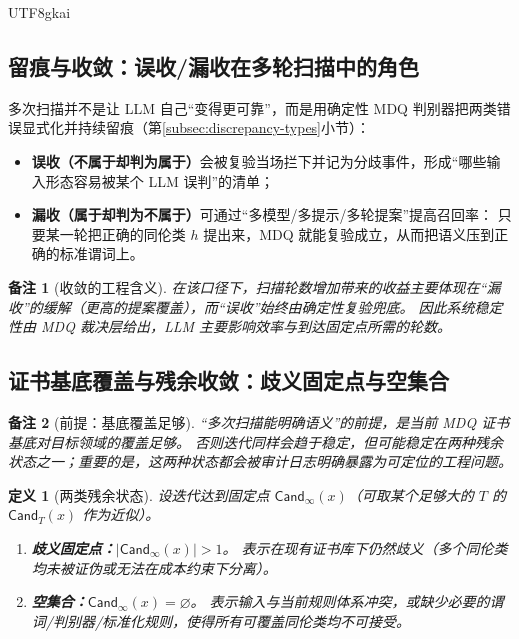 \documentclass[12pt]{article}
\newtheorem{definition}{定义}[section]
\newtheorem{remark}{备注}[section]
\begin{document}
\begin{CJK*}{UTF8}{gkai}
\subsection{留痕与收敛：误收/漏收在多轮扫描中的角色}
\label{subsec:discrepancy-and-convergence}

多次扫描并不是让 LLM 自己“变得更可靠”，而是用确定性 MDQ 判别器把两类错误显式化并持续留痕（第\ref{subsec:discrepancy-types}小节）：
\begin{itemize}
  \item \textbf{误收（不属于却判为属于）}会被复验当场拦下并记为分歧事件，形成“哪些输入形态容易被某个 LLM 误判”的清单；
  \item \textbf{漏收（属于却判为不属于）}可通过“多模型/多提示/多轮提案”提高召回率：
  只要某一轮把正确的同伦类 $h$ 提出来，MDQ 就能复验成立，从而把语义压到正确的标准谓词上。
\end{itemize}

\begin{remark}[收敛的工程含义]
在该口径下，扫描轮数增加带来的收益主要体现在“漏收”的缓解（更高的提案覆盖），而“误收”始终由确定性复验兜底。
因此系统稳定性由 MDQ 裁决层给出，LLM 主要影响效率与到达固定点所需的轮数。
\end{remark}

\subsection{证书基底覆盖与残余收敛：歧义固定点与空集合}
\label{subsec:basis-coverage-residual}

\begin{remark}[前提：基底覆盖足够]
“多次扫描能明确语义”的前提，是当前 MDQ 证书基底对目标领域的覆盖足够。
否则迭代同样会趋于稳定，但可能稳定在两种残余状态之一；重要的是，这两种状态都会被审计日志明确暴露为可定位的工程问题。
\end{remark}

\begin{definition}[两类残余状态]
设迭代达到固定点 $\mathsf{Cand}_\infty(x)$（可取某个足够大的 $T$ 的 $\mathsf{Cand}_T(x)$ 作为近似）。
\begin{enumerate}
  \item \textbf{歧义固定点：}$|\mathsf{Cand}_\infty(x)|>1$。
  表示在现有证书库下仍然歧义（多个同伦类均未被证伪或无法在成本约束下分离）。
  \item \textbf{空集合：}$\mathsf{Cand}_\infty(x)=\varnothing$。
  表示输入与当前规则体系冲突，或缺少必要的谓词/判别器/标准化规则，使得所有可覆盖同伦类均不可接受。
\end{enumerate}
\end{definition}


\end{CJK*}
\end{document}
